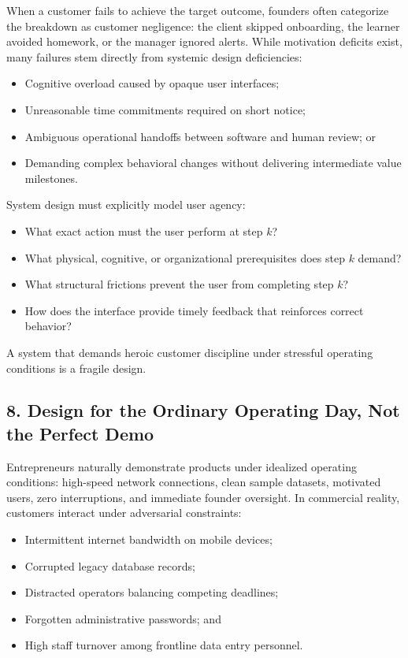 When a customer fails to achieve the target outcome, founders often categorize the breakdown as customer negligence: the client skipped onboarding, the learner avoided homework, or the manager ignored alerts. While motivation deficits exist, many failures stem directly from systemic design deficiencies:
\begin{itemize}
    \item Cognitive overload caused by opaque user interfaces;
    \item Unreasonable time commitments required on short notice;
    \item Ambiguous operational handoffs between software and human review; or
    \item Demanding complex behavioral changes without delivering intermediate value milestones.
\end{itemize}

System design must explicitly model user agency:
\begin{itemize}
    \item What exact action must the user perform at step $k$?
    \item What physical, cognitive, or organizational prerequisites does step $k$ demand?
    \item What structural frictions prevent the user from completing step $k$?
    \item How does the interface provide timely feedback that reinforces correct behavior?
\end{itemize}

A system that demands heroic customer discipline under stressful operating conditions is a fragile design.

\subsection*{8. Design for the Ordinary Operating Day, Not the Perfect Demo}

Entrepreneurs naturally demonstrate products under idealized operating conditions: high-speed network connections, clean sample datasets, motivated users, zero interruptions, and immediate founder oversight. In commercial reality, customers interact under adversarial constraints:
\begin{itemize}
    \item Intermittent internet bandwidth on mobile devices;
    \item Corrupted legacy database records;
    \item Distracted operators balancing competing deadlines;
    \item Forgotten administrative passwords; and
    \item High staff turnover among frontline data entry personnel.
\end{itemize}

